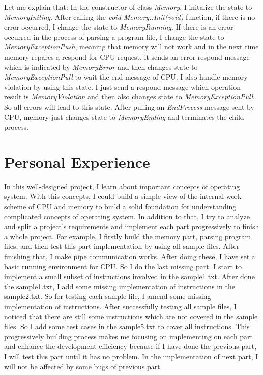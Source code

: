 \documentclass[a4paper]{report}
\begin{document}
Let me explain that: In the constructor of class \textit{\color{blue} Memory}, I initalize the state to \textit{\color{blue} MemoryIniting}. After calling the \textit{\color{blue} void Memory::Init(void)} function, if there is no error occurred, I change the state to \textit{\color{blue} MemoryRunning}. If there is an error occurred in the process of parsing a program file, I change the state to \textit{\color{blue} MemoryExceptionPush}, meaning that memory will not work and in the next time memory repares a respond for CPU request, it sends an error respond message which is indicated by \textit{\color{blue} MemoryError} and then changes state to \textit{\color{blue} MemoryExceptionPull} to wait the end message of CPU. I also handle memory violation by using this state. I just send a respond message which operation result is \textit{\color{blue} MemoryViolation} and then also changes state to \textit{\color{blue} MemoryExceptionPull}. So all errors will lead to this state. After pulling an \textit{\color{blue} EndProcess} message sent by CPU, memory just changes state to \textit{\color{blue} MemoryEnding} and terminates the child process.

\section*{Personal Experience}
In this well-designed project, I learn about important concepts of operating system. With this concepts, I could build a simple view of the internal work scheme of CPU and memory to build a solid foundation for understanding complicated concepts of operating system. In addition to that, I try to analyze and  split a project's requirements and implement each part progressively to finish a whole project. For example, I firstly build the memory part, parsing program files, and then test this part implementation by using all sample files. After finishing that, I make pipe communication works. After doing these, I have set a basic running environment for CPU. So I do the last missing part. I start to implement a small subset of instructions involved in the sample1.txt. After done the sample1.txt, I add some missing implementation of instructions in the sample2.txt. So for testing each sample file, I amend some missing implementation of instructions. After successfully testing all sample files, I noticed that there are still some instructions which are not covered in the sample files. So I add some test cases in the sample5.txt to cover all instructions. This progressively building process makes me focusing on implementing on each part and enhance the development efficiency because if I have done the previous part, I will test this part until it has no problem. In the implementation of next part, I will not be affected by some bugs of previous part.
\end{document}

